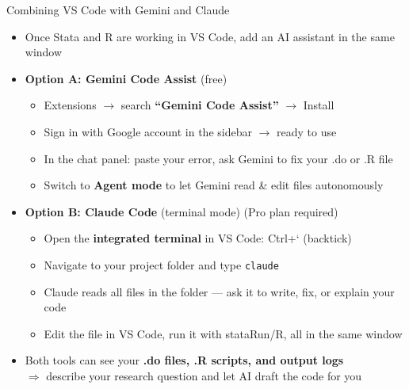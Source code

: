\documentclass[hyperref={pdfpagelabels=false}]{beamer}
\begin{document}

\begin{frame}{Combining VS Code with Gemini and Claude}

\begin{itemize}
	\item Once Stata and R are working in VS Code, add an AI assistant in the same window
	\vspace{0.3cm}
	\item \textbf{Option A: Gemini Code Assist} \hfill {\small (free)}
	\vspace{0.1cm}
	\begin{itemize}
		\item Extensions $\to$ search \textbf{``Gemini Code Assist''} $\to$ Install
		\vspace{0.1cm}
		\item Sign in with Google account in the sidebar $\to$ ready to use
		\vspace{0.1cm}
		\item In the chat panel: paste your error, ask Gemini to fix your .do or .R file
		\vspace{0.1cm}
		\item Switch to \textbf{Agent mode} to let Gemini read \& edit files autonomously
	\end{itemize}
	\vspace{0.3cm}
	\item \textbf{Option B: Claude Code} (terminal mode) \hfill {\small (Pro plan required)}
	\vspace{0.1cm}
	\begin{itemize}
		\item Open the \textbf{integrated terminal} in VS Code: Ctrl+` (backtick)
		\vspace{0.1cm}
		\item Navigate to your project folder and type \texttt{claude}
		\vspace{0.1cm}
		\item Claude reads all files in the folder --- ask it to write, fix, or explain your code
		\vspace{0.1cm}
		\item Edit the file in VS Code, run it with stataRun/R, all in the same window
	\end{itemize}
	\vspace{0.2cm}
	\item Both tools can see your \textbf{.do files, .R scripts, and output logs}\\
	      $\Rightarrow$ describe your research question and let AI draft the code for you
\end{itemize}

\end{frame}
\end{document}
